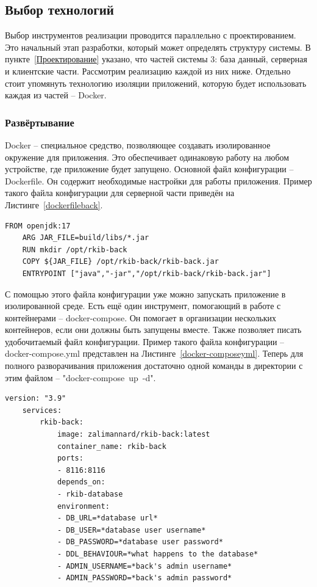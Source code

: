 \documentclass[a4paper,article]{article}
\begin{document}
    \subsection{Выбор технологий}\label{Реализация. Выбор}

    Выбор инструментов реализации проводится параллельно с проектированием. Это начальный этап разработки, который может определять структуру системы. В пункте~\ref{Проектирование} указано, что частей системы 3: база данный, серверная и клиентские части. Рассмотрим реализацию каждой из них ниже. Отдельно стоит упомянуть технологию изоляции приложений, которую будет использовать каждая из частей -- Docker.

    \subsubsection{Развёртывание}\label{Реализация. Выбор. Докер}

    Docker -- специальное средство, позволяющее создавать изолированное окружение для приложения. Это обеспечивает одинаковую работу на любом устройстве, где приложение будет запущено. Основной файл конфигурации -- Dockerfile. Он содержит необходимые настройки для работы приложения. Пример такого файла конфигурации для серверной части приведён на Листинге~\ref{dockerfileback}.

    \begin{lstlisting}[label=dockerfileback,caption=Пример Dockerfile для бекенда]
    FROM openjdk:17
    ARG JAR_FILE=build/libs/*.jar
    RUN mkdir /opt/rkib-back
    COPY ${JAR_FILE} /opt/rkib-back/rkib-back.jar
    ENTRYPOINT ["java","-jar","/opt/rkib-back/rkib-back.jar"]
    \end{lstlisting}

    С помощью этого файла конфигурации уже можно запускать приложение в изолированной среде. Есть ещё один инструмент, помогающий в работе с контейнерами -- docker-compose. Он помогает в организации нескольких контейнеров, если они должны быть запущены вместе. Также позволяет писать удобочитаемый файл конфигурации. Пример такого файла конфигурации -- docker-compose.yml представлен на Листинге~\ref{docker-composeyml}. Теперь для полного разворачивания приложения достаточно одной команды в директории с этим файлом -- "docker-compose~up~-d".

    \begin{lstlisting}[label=docker-composeyml,caption=Пример файла конфигурации docker-compose.yml]
    version: "3.9"
    services:
        rkib-back:
            image: zalimannard/rkib-back:latest
            container_name: rkib-back
            ports:
            - 8116:8116
            depends_on:
            - rkib-database
            environment:
            - DB_URL=*database url*
            - DB_USER=*database user username*
            - DB_PASSWORD=*database user password*
            - DDL_BEHAVIOUR=*what happens to the database*
            - ADMIN_USERNAME=*back's admin username*
            - ADMIN_PASSWORD=*back's admin password*
    \end{lstlisting}
\end{document}
